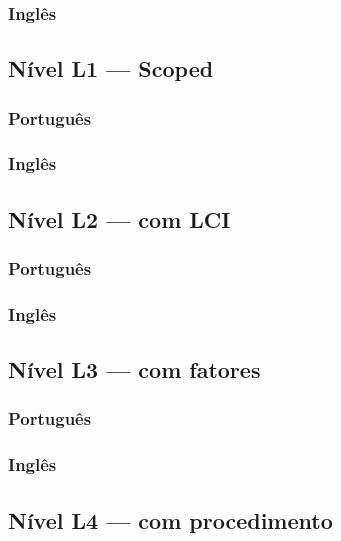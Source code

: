 \documentclass[12pt,a4paper]{article}
\begin{document}
\subsubsection{Inglês}


\subsection{Nível L1 --- Scoped}
\subsubsection{Português}

\subsubsection{Inglês}


\subsection{Nível L2 --- com LCI}
\subsubsection{Português}

\subsubsection{Inglês}


\subsection{Nível L3 --- com fatores}
\subsubsection{Português}

\subsubsection{Inglês}


\subsection{Nível L4 --- com procedimento}
\end{document}
